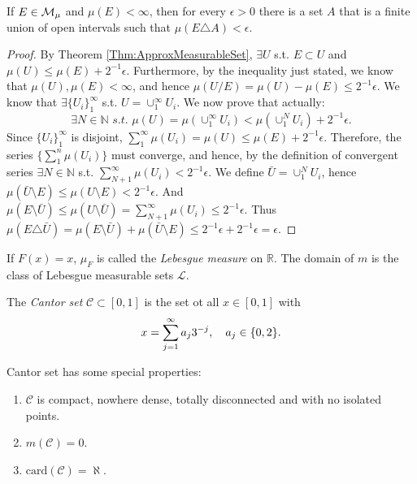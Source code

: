 \begin{exc}
    If $E\in\mathcal{M}_{\mu}$ and $\mu(E)<\infty$, then for every 
    $\epsilon>0$ there is a set $A$ that is a finite union of open 
    intervals such that $\mu(E\triangle A)<\epsilon$.
\end{exc}
\begin{proof}
    By Theorem \ref{Thm:ApproxMeasurableSet}, $\exists U$ s.t. $E\subset U$
    and $\mu(U)\leq\mu(E)+2^{-1}\epsilon$. Furthermore, by the
    inequality just stated, we know that $\mu(U),\mu(E)<\infty$, and hence 
    $\mu(U/E)=\mu(U)-\mu(E)\leq 2^{-1}\epsilon$. We know that $\exists 
    \{U_i\}_1^{\infty}$
    s.t. $U=\cup_1^{\infty}U_i$. We now prove that actually:
    \begin{displaymath}
        \exists N\in\mathbb{N}\textit{ s.t. }\mu(U)=\mu(\cup_1^{\infty}U_i)
        <\mu(\cup_1^{N}U_i)+2^{-1}\epsilon.
    \end{displaymath}
    Since $\{U_i\}_1^{\infty}$ is disjoint, $\sum_1^{\infty}\mu(U_i)=\mu(U)
    \leq\mu(E)+2^{-1}\epsilon$. Therefore, the series $\{\sum_1^{n}\mu(U_i)\}$
    must converge, and hence, by the definition of convergent series $\exists
    N\in\mathbb{N}$ s.t. $\sum_{N+1}^{\infty}\mu(U_i)<2^{-1}\epsilon$. We define
    $\bar{U}=\cup_1^{N}U_i$, hence $\mu(\bar{U}\setminus E)
    \leq\mu(U\setminus E)<2^{-1}\epsilon$. 
    And $\mu(E\setminus\bar{U})\leq\mu(U\setminus\bar{U})=
    \sum_{N+1}^{\infty}\mu(U_i)\leq2^{-1}\epsilon$.
    Thus $\mu(E\triangle\bar{U})=\mu(E\setminus\bar{U})+
    \mu(\bar{U}\setminus E)\leq2^{-1}\epsilon+2^{-1}\epsilon=\epsilon$.
\end{proof}
\begin{defn}
    \label{Defn:LebesgueMeas}
    If $F(x)=x$, $\mu_{F}$ is called the \textit{Lebesgue measure }on 
    $\mathbb{R}$. The domain of $m$ is the class of Lebesgue 
    measurable sets $\mathcal{L}$.
\end{defn}
\begin{defn}
    \label{Defn:CantorSet}
    The \textit{Cantor set }$\mathcal{C}\subset[0,1]$ is the 
    set ot all $x\in[0,1]$ with 
    \begin{displaymath}
        x=\sum_{j=1}^{\infty}a_j3^{-j},\quad a_j\in\{0,2\}.
    \end{displaymath}
\end{defn}
\begin{prop}
    \label{Prop:PropertiesOfCantorSet}
    Cantor set has some special properties:
    \begin{enumerate}
        \item $\mathcal{C}$ is compact, nowhere dense, 
        totally disconnected and with no isolated points.
        \item $m(\mathcal{C})=0$.
        \item $\text{card}(\mathcal{C})=\aleph$.
    \end{enumerate}
\end{prop}
